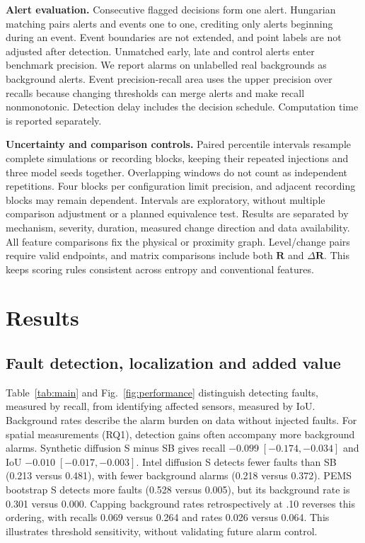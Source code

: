 \documentclass{llncs}
\newcommand{\R}{\mathbf R}
\begin{document}
\textbf{Alert evaluation.} Consecutive flagged decisions form one alert.
Hungarian matching pairs alerts and events one to one, crediting only alerts
beginning during an event. Event boundaries are not extended, and point
labels are not adjusted after detection. Unmatched early, late and control
alerts enter benchmark precision. We report alarms on unlabelled real
backgrounds as background alerts. Event precision-recall area uses the upper
precision  over recalls because changing thresholds can
merge alerts and make recall nonmonotonic. Detection delay includes the
decision schedule. Computation time is reported separately.

\textbf{Uncertainty and comparison controls.} Paired percentile intervals
resample complete simulations or recording blocks, keeping their repeated
injections and three model seeds together. Overlapping windows do not count
as independent repetitions. Four blocks per configuration limit precision,
and adjacent recording blocks may remain dependent. Intervals are exploratory,
without multiple comparison adjustment or a planned equivalence test.
Results are separated by mechanism, severity, duration, measured change
direction and data availability. All feature comparisons fix the physical
or proximity graph. Level/change pairs require valid endpoints, and matrix
comparisons include both $\R$ and $\Delta\R$. This keeps scoring rules
consistent across entropy and conventional features.




\section{Results}

\subsection{Fault detection, localization and added value}
Table~\ref{tab:main} and Fig.~\ref{fig:performance} distinguish detecting
faults, measured by recall, from identifying affected sensors, measured by IoU.
Background rates describe the alarm burden on data without injected faults.
For spatial measurements (RQ1), detection gains often accompany more
background alarms. Synthetic diffusion S minus SB gives recall
$-0.099\;[-0.174,-0.034]$ and IoU $-0.010\;[-0.017,-0.003]$.
Intel diffusion S detects fewer faults than SB (0.213 versus 0.481),
with fewer background alarms (0.218 versus 0.372).
PEMS bootstrap S detects more faults (0.528 versus 0.005), but its
background rate is 0.301 versus 0.000. Capping background rates
retrospectively at .10 reverses this ordering, with recalls 0.069 versus
0.264 and rates 0.026 versus 0.064. This illustrates threshold sensitivity,
without validating future alarm control.
\end{document}
